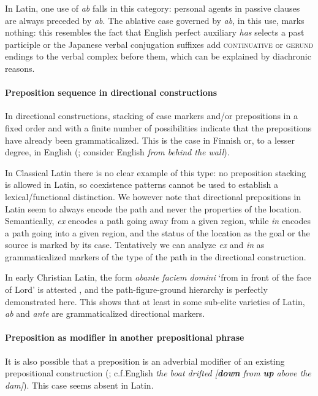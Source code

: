 \documentclass[a4paper, oneside, 12pt]{report}
\newcommand*{\citepage}[1]{p.~{#1}}
\newcommand{\form}[1]{\emph{#1}}
\newcommand*{\category}[1]{\textsc{#1}}
\newcommand{\translate}[1]{`#1'}
\begin{document}
In Latin, one use of \form{ab} falls in this category:
personal agents in passive clauses are always 
preceded by \form{ab}.
The ablative case governed by \form{ab}, in this use, marks nothing:
this resembles the fact that English perfect auxiliary \form{has} selects a past participle 
or the Japanese verbal conjugation suffixes add \category{continuative} or \category{gerund} endings to the verbal complex before them,
which can be explained by diachronic reasons.

\paragraph*{Preposition sequence in directional constructions}
\label{sec:modifiy.prep.grammar.directional}
In directional constructions,
stacking of case markers and/or prepositions in a fixed order 
and with a finite number of possibilities
indicate that the prepositions have already been grammaticalized.
This is the case in Finnish or, to a lesser degree, in English 
(\citealt{spatialpp}; consider English \form{from behind the wall}).

In Classical Latin there is no clear example of this type:
no preposition stacking is allowed in Latin,
so coexistence patterns cannot be used to establish a lexical/functional distinction.
We however note that directional prepositions in Latin
seem to always encode the path
and never the properties of the location.
Semantically, \form{ex} encodes a path going away from a given region, 
while \form{in} encodes a path going into a given region,
and the status of the location as the goal or the source
is marked by its case.
Tentatively we can analyze \form{ex} and \form{in}
as grammaticalized markers of the type of the path in the directional construction.

In early Christian Latin, the form \form{abante faciem domini}
\translate{from in front of the face of Lord} is attested
\citep[\citepage{24}]{herman2010vulgar},
and the path-figure-ground hierarchy is perfectly demonstrated here.
This shows that at least in some sub-elite varieties of Latin,
\form{ab} and \form{ante} are grammaticalized directional markers.

\paragraph*{Preposition as modifier in another prepositional phrase}
It is also possible that a preposition is an adverbial modifier of an existing prepositional construction
(\citealt{botwinik2008greek};
c.f.English \form{the boat drifted [\textbf{down} from \textbf{up} above the dam]}).
This case seems absent in Latin.
\end{document}
